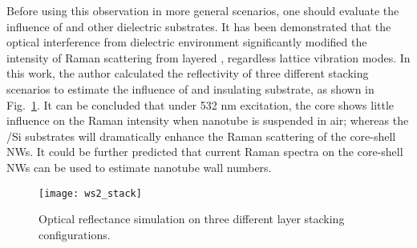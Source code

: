 Before using this observation in more general scenarios, one should evaluate the influence of  and other dielectric substrates. It has been demonstrated that the optical interference from dielectric environment significantly modified the intensity of Raman scattering from layered , regardless lattice vibration modes.\cite{Li2012} In this work, the author calculated the reflectivity of three different stacking scenarios to estimate the influence of  and insulating substrate, as shown in Fig.~\ref{fig:ch5ws2stk}. It can be concluded that under 532 nm excitation, the  core shows little influence on the Raman intensity when  nanotube is suspended in air; whereas the /Si substrates will dramatically enhance the Raman scattering of the core-shell NWs. It could be further predicted that current Raman spectra on the core-shell NWs can be used to estimate  nanotube wall numbers. 
\begin{figure}[htb]
\centering
\texttt{[image: ws2\_stack]}
\caption[Optical reflectance simulation on three different  layer stacking configurations]{Optical reflectance simulation on three different  layer stacking configurations.}
\label{fig:ch5ws2stk}
\end{figure}

